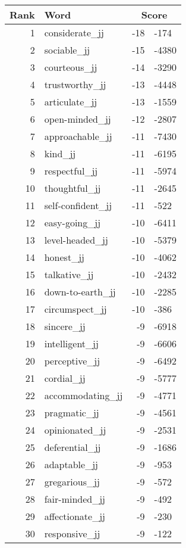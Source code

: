 \begin{longtable}[!htbp]{| rlr@{.}l |}
    \hline
    \textbf{Rank} & \textbf{Word} & \multicolumn{2}{c|}{\textbf{Score}} \\
    \hline
    \endhead
    1 & considerate\_jj & -18 & -174 \\
    2 & sociable\_jj & -15 & -4380 \\
    3 & courteous\_jj & -14 & -3290 \\
    4 & trustworthy\_jj & -13 & -4448 \\
    5 & articulate\_jj & -13 & -1559 \\
    6 & open-minded\_jj & -12 & -2807 \\
    7 & approachable\_jj & -11 & -7430 \\
    8 & kind\_jj & -11 & -6195 \\
    9 & respectful\_jj & -11 & -5974 \\
    10 & thoughtful\_jj & -11 & -2645 \\
    11 & self-confident\_jj & -11 & -522 \\
    12 & easy-going\_jj & -10 & -6411 \\
    13 & level-headed\_jj & -10 & -5379 \\
    14 & honest\_jj & -10 & -4062 \\
    15 & talkative\_jj & -10 & -2432 \\
    16 & down-to-earth\_jj & -10 & -2285 \\
    17 & circumspect\_jj & -10 & -386 \\
    18 & sincere\_jj & -9 & -6918 \\
    19 & intelligent\_jj & -9 & -6606 \\
    20 & perceptive\_jj & -9 & -6492 \\
    21 & cordial\_jj & -9 & -5777 \\
    22 & accommodating\_jj & -9 & -4771 \\
    23 & pragmatic\_jj & -9 & -4561 \\
    24 & opinionated\_jj & -9 & -2531 \\
    25 & deferential\_jj & -9 & -1686 \\
    26 & adaptable\_jj & -9 & -953 \\
    27 & gregarious\_jj & -9 & -572 \\
    28 & fair-minded\_jj & -9 & -492 \\
    29 & affectionate\_jj & -9 & -230 \\
    30 & responsive\_jj & -9 & -122 \\

\end{longtable}

